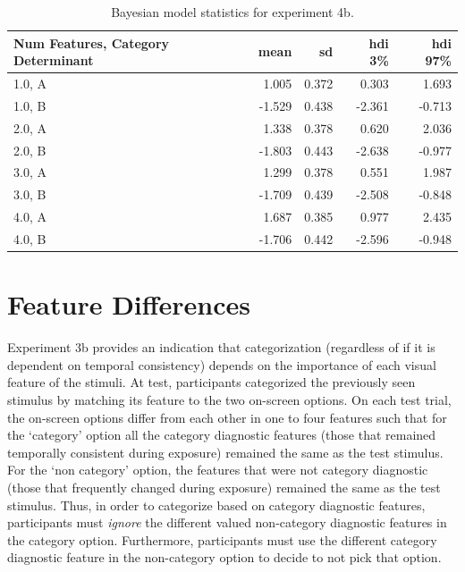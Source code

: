 \begin{table}[H]
    \centering
    \caption{Bayesian model statistics for experiment 4b.}
    \label{tab:exp5-bayes-model-results}
    \begin{tabular}{lrrrr}
        \toprule
         Num Features, Category Determinant & mean & sd & hdi 3\% & hdi 97\% \\
        \midrule
        1.0, A & 1.005 & 0.372 & 0.303 & 1.693 \\
        1.0, B & -1.529 & 0.438 & -2.361 & -0.713 \\
        2.0, A & 1.338 & 0.378 & 0.620 & 2.036 \\
        2.0, B & -1.803 & 0.443 & -2.638 & -0.977 \\
        3.0, A & 1.299 & 0.378 & 0.551 & 1.987 \\
        3.0, B & -1.709 & 0.439 & -2.508 & -0.848 \\
        4.0, A & 1.687 & 0.385 & 0.977 & 2.435 \\
        4.0, B & -1.706 & 0.442 & -2.596 & -0.948 \\
        \bottomrule
        \end{tabular}
        
\end{table}

\section{Feature Differences}
Experiment 3b provides an indication that categorization (regardless of if it is dependent on temporal consistency) depends on the importance of each visual feature of the stimuli. At test, participants categorized the previously seen stimulus by matching its feature to the two on-screen options. On each test trial, the on-screen options differ from each other in one to four features such that for the `category' option all the category diagnostic features (those that remained temporally consistent during exposure) remained the same as the test stimulus. For the `non category' option, the features that were not category diagnostic (those that frequently changed during exposure) remained the same as the test stimulus. Thus, in order to categorize based on category diagnostic features, participants must \textit{ignore} the different valued non-category diagnostic features in the category option. Furthermore, participants must use the different category diagnostic feature in the non-category option to decide to not pick that option. 


